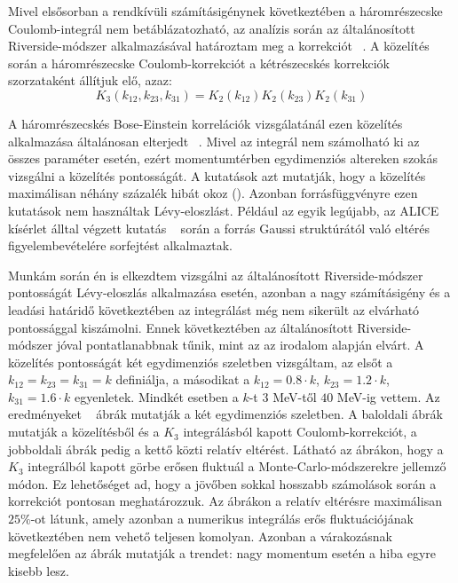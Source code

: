 \documentclass[11pt,a4paper]{article}
\numberwithin{equation}{subsection}
\numberwithin{figure}{section}
\begin{document}
Mivel elsősorban a rendkívüli számításigénynek következtében a háromrészecske Coulomb-integrál nem betáblázatozható, az analízis során az általánosított Riverside-módszer alkalmazásával határoztam meg a korrekciót ~\cite{PhysRevLett.85.2895, PhysRevLett.91.262301}. A közelítés során a háromrészecske Coulomb-korrekciót a kétrészecskés korrekciók szorzataként állítjuk elő, azaz:
\begin{equation}
K_3(k_{12}, k_{23}, k_{31}) = K_2(k_{12})K_2(k_{23})K_2(k_{31})
\end{equation}


A háromrészecskés Bose-Einstein korrelációk vizsgálatánál ezen közelítés alkalmazása általánosan elterjedt ~\cite{Abelev:2013pqa}. Mivel az integrál nem számolható ki az összes paraméter esetén, ezért momentumtérben egydimenziós altereken szokás vizsgálni a közelítés pontosságát. A kutatások azt mutatják, hogy a közelítés maximálisan néhány százalék hibát okoz (\cite{Abelev:2013pqa}). Azonban forrásfüggvényre ezen kutatások nem használtak Lévy-eloszlást. Például az egyik legújabb, az ALICE kísérlet álltal végzett kutatás  ~\cite{Abelev:2013pqa} során a forrás Gaussi struktúrától való eltérés figyelembevételére sorfejtést alkalmaztak. 

Munkám során én is elkezdtem vizsgálni az általánosított Riverside-módszer pontosságát Lévy-eloszlás alkalmazása esetén, azonban a nagy számításigény és a leadási határidő következtében az integrálást még nem sikerült az elvárható pontossággal kiszámolni. Ennek következtében az általánosított Riverside-módszer jóval pontatlanabbnak tűnik, mint az az irodalom alapján elvárt. A közelítés pontosságát két egydimenziós szeletben vizsgáltam, az elsőt a $k_{12}=k_{23}=k_{31}=k$ definiálja, a másodikat a $k_{12}=0.8\cdot k$, $k_{23}=1.2\cdot k$, $k_{31}=1.6\cdot k$ egyenletek. Mindkét esetben a $k$-t $3$ MeV-től $40$ MeV-ig vettem. Az eredményeket ~ ábrák mutatják a két egydimenziós szeletben. A baloldali ábrák mutatják a közelítésből és a $K_3$ integrálásból kapott Coulomb-korrekciót, a jobboldali ábrák pedig a kettő közti relatív eltérést. Látható az ábrákon, hogy a $K_3$ integrálból kapott görbe erősen fluktuál a Monte-Carlo-módszerekre jellemző módon. Ez lehetőséget ad, hogy a jövőben sokkal hosszabb számolások során a korrekciót pontosan meghatározzuk. Az ábrákon a relatív eltérésre maximálisan $25\%$-ot látunk, amely azonban a numerikus integrálás erős fluktuációjának következtében nem vehető teljesen komolyan. Azonban a várakozásnak megfelelően az ábrák mutatják a trendet: nagy momentum esetén a hiba egyre kisebb lesz.
\end{document}
